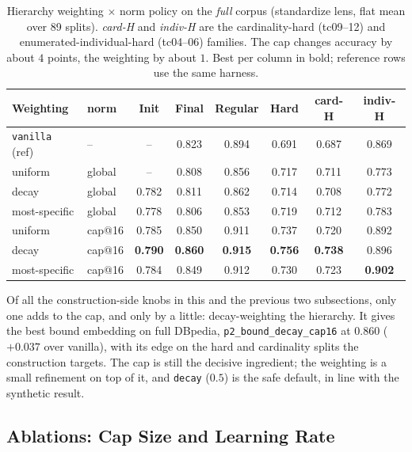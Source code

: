 \documentclass[a4paper,oneside,bibliography=totoc]{scrbook}
\begin{document}
\begin{table}[t]
\centering
\small
\caption{Hierarchy weighting $\times$ norm policy on the \emph{full} corpus
(standardize lens, flat mean over 89 splits). \emph{card-H} and \emph{indiv-H}
are the cardinality-hard (tc09--12) and enumerated-individual-hard (tc04--06)
families. The cap changes accuracy by about $4$ points, the weighting by about
$1$. Best per column in bold; reference rows use the same harness.}
\label{tab:dbpedia_hierarchy}
\setlength{\tabcolsep}{5pt}
\begin{tabular}{llcccccc}
\toprule
\textbf{Weighting} & \textbf{norm} & \textbf{Init} & \textbf{Final}
& \textbf{Regular} & \textbf{Hard} & \textbf{card-H} & \textbf{indiv-H} \\
\midrule
\texttt{vanilla} (ref) & --     & --    & 0.823 & 0.894 & 0.691 & 0.687 & 0.869 \\
\midrule
uniform        & global & --    & 0.808 & 0.856 & 0.717 & 0.711 & 0.773 \\
decay          & global & 0.782 & 0.811 & 0.862 & 0.714 & 0.708 & 0.772 \\
most-specific  & global & 0.778 & 0.806 & 0.853 & 0.719 & 0.712 & 0.783 \\
\midrule
uniform        & cap@16 & 0.785 & 0.850 & 0.911 & 0.737 & 0.720 & 0.892 \\
decay          & cap@16 & \textbf{0.790} & \textbf{0.860} & \textbf{0.915} & \textbf{0.756} & \textbf{0.738} & 0.896 \\
most-specific  & cap@16 & 0.784 & 0.849 & 0.912 & 0.730 & 0.723 & \textbf{0.902} \\
\bottomrule
\end{tabular}
\end{table}

Of all the construction-side knobs in this and the previous two subsections, only
one adds to the cap, and only by a little: decay-weighting the hierarchy. It
gives the best bound embedding on full DBpedia, \texttt{p2\_bound\_decay\_cap16}
at $0.860$ ($+0.037$ over vanilla), with its edge on the hard and cardinality
splits the construction targets. The cap is still the decisive ingredient; the
weighting is a small refinement on top of it, and \texttt{decay} ($0.5$) is the
safe default, in line with the synthetic result.

\subsection{Ablations: Cap Size and Learning Rate}
\label{sec:dbpedia_ablations}
\end{document}
